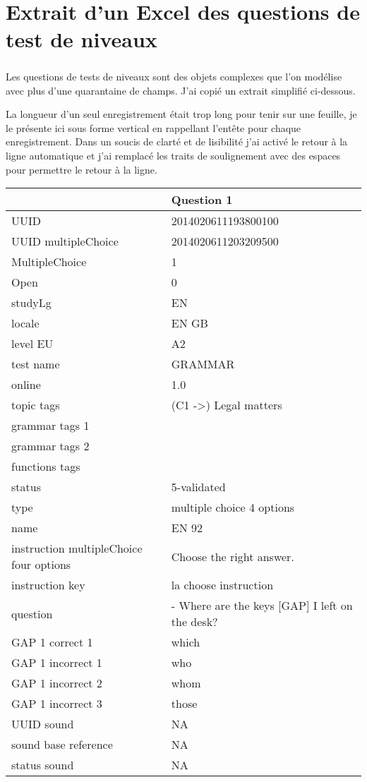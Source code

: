 \chapter{Extrait d'un Excel des questions de test de niveaux}
\label{ch:leveltest-sample}

\paragraph{}
Les questions de tests de niveaux sont des objets complexes que l'on modélise avec plus d'une quarantaine de champs.
J'ai copié un extrait simplifié ci-dessous.

La longueur d'un seul enregistrement était trop long pour tenir sur une feuille, je le présente ici sous forme vertical en rappellant l'entête pour chaque enregistrement.
Dans un soucis de clarté et de lisibilité j'ai activé le retour à la ligne automatique et j'ai remplacé les traits de soulignement avec des espaces pour permettre le retour à la ligne.

\begin{table}[ht]
\begin{tabular}{p{5cm}|p{8cm}}
 & Question 1 \\ \hline
UUID & 2014020611193800100 \\
UUID multipleChoice & 2014020611203209500 \\
MultipleChoice & 1 \\
Open & 0 \\
studyLg & EN \\
locale & EN GB \\
level EU & A2 \\
test name & GRAMMAR \\
online & 1.0 \\
topic tags & (C1 -\textgreater{}) Legal matters \\
grammar tags 1 &  \\
grammar tags 2 &  \\
functions tags &  \\
status & 5-validated \\
type & multiple choice 4 options \\
name & EN 92 \\
instruction multipleChoice four options & Choose the right answer. \\
instruction key & la choose instruction \\
question & - Where are the keys {[}GAP{]} I left on the desk? \\
GAP 1 correct 1 & which \\
GAP 1 incorrect 1 & who \\
GAP 1 incorrect 2 & whom \\
GAP 1 incorrect 3 & those \\
UUID sound & NA \\
sound base reference & NA \\
status sound & NA
\end{tabular}
\end{table}

